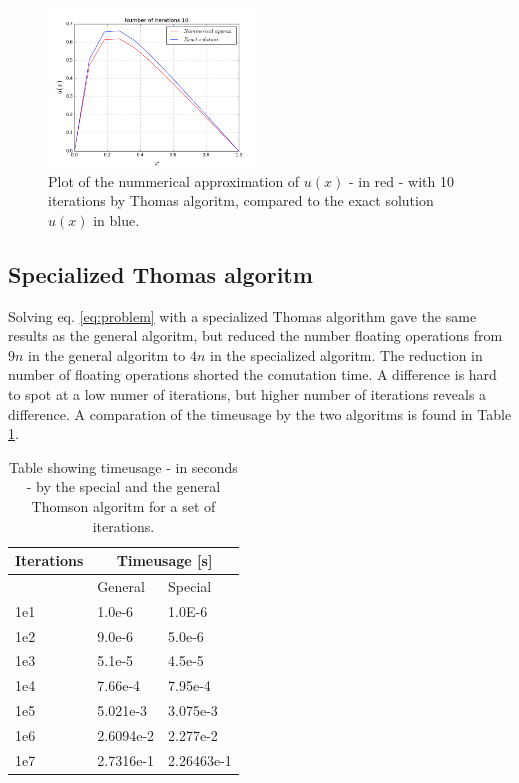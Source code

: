 \documentclass[twoside,twocolumn]{article}
\begin{document}
\begin{figure}[htp]
\includegraphics[width=0.5\textwidth]{figures/b-run10.png} 
\caption{Plot of the nummerical approximation of $u(x)$ - in red - with 10 iterations by Thomas algoritm, compared to the exact solution $u(x)$ in blue.} \label{fig:Thomas10}
\end{figure}

\subsection{Specialized Thomas algoritm}
Solving eq. \ref{eq:problem} with a specialized Thomas algorithm gave the same results as the general algoritm, but reduced the number floating operations from $9n$ in the general algoritm to $4n$ in the specialized algoritm. The reduction in number of floating operations shorted the comutation time. A difference is hard to spot at a low numer of iterations, but higher number of iterations reveals a difference. A comparation of the timeusage by the two algoritms is found in Table \ref{tbl:ThompsonTime}.
\begin{table}[htp]
\centering
\begin{tabular}{|l|l|l|} \hline
Iterations & \multicolumn{2}{|c|}{Timeusage [s]}\\ \hline
 	& General 	& Special\\ \hline
1e1	& 1.0e-6	& 1.0E-6\\
1e2 & 9.0e-6	& 5.0e-6\\
1e3 & 5.1e-5	& 4.5e-5\\
1e4 & 7.66e-4	& 7.95e-4\\
1e5 & 5.021e-3	& 3.075e-3\\
1e6 & 2.6094e-2	&2.277e-2\\
1e7 & 2.7316e-1	& 2.26463e-1 \\ \hline
\end{tabular}
\caption{Table showing timeusage - in seconds - by the special and the general Thomson algoritm for a set of iterations.} \label{tbl:ThompsonTime}
\end{table}
\end{document}
